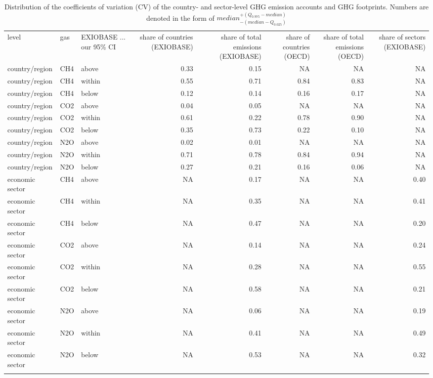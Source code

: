 \begin{table}

\caption{\label{tab:valid}Distribution of the coefficients of variation (CV) of 
                the country- and sector-level GHG emission accounts and GHG footprints. 
                Numbers are denoted in the form of 
                $median^{+(Q_{0.975}-median)}_{-(median - Q_{0.025})}$}
\centering
\begin{tabular}[t]{lllrrrrr}
\tophline
level & gas & EXIOBASE ... our 95\% CI & share of countries (EXIOBASE) & share of total emissions (EXIOBASE) & share of countries (OECD) & share of total emissions (OECD) & share of sectors (EXIOBASE)\\
\middlehline
country/region & CH4 & above & 0.33 & 0.15 & NA & NA & NA\\
country/region & CH4 & within & 0.55 & 0.71 & 0.84 & 0.83 & NA\\
country/region & CH4 & below & 0.12 & 0.14 & 0.16 & 0.17 & NA\\
country/region & CO2 & above & 0.04 & 0.05 & NA & NA & NA\\
country/region & CO2 & within & 0.61 & 0.22 & 0.78 & 0.90 & NA\\
country/region & CO2 & below & 0.35 & 0.73 & 0.22 & 0.10 & NA\\
country/region & N2O & above & 0.02 & 0.01 & NA & NA & NA\\
country/region & N2O & within & 0.71 & 0.78 & 0.84 & 0.94 & NA\\
country/region & N2O & below & 0.27 & 0.21 & 0.16 & 0.06 & NA\\
economic sector & CH4 & above & NA & 0.17 & NA & NA & 0.40\\
economic sector & CH4 & within & NA & 0.35 & NA & NA & 0.41\\
economic sector & CH4 & below & NA & 0.47 & NA & NA & 0.20\\
economic sector & CO2 & above & NA & 0.14 & NA & NA & 0.24\\
economic sector & CO2 & within & NA & 0.28 & NA & NA & 0.55\\
economic sector & CO2 & below & NA & 0.58 & NA & NA & 0.21\\
economic sector & N2O & above & NA & 0.06 & NA & NA & 0.19\\
economic sector & N2O & within & NA & 0.41 & NA & NA & 0.49\\
economic sector & N2O & below & NA & 0.53 & NA & NA & 0.32\\
\bottomhline
\end{tabular}
\end{table}
